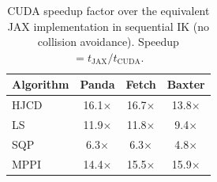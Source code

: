 \begin{table}[t]
\centering
\caption{CUDA speedup factor over the equivalent JAX implementation in sequential IK (no collision avoidance). Speedup $= t_{\text{JAX}} / t_{\text{CUDA}}$.}
\label{tab:ik_cuda_speedup}
\small
\begin{tabular}{lccc}
\toprule
\textbf{Algorithm} & \textbf{Panda} & \textbf{Fetch} & \textbf{Baxter} \\
\midrule
HJCD & 16.1$\times$ & 16.7$\times$ & 13.8$\times$ \\
LS & 11.9$\times$ & 11.8$\times$ & 9.4$\times$ \\
SQP & 6.3$\times$ & 6.3$\times$ & 4.8$\times$ \\
MPPI & 14.4$\times$ & 15.5$\times$ & 15.9$\times$ \\
\bottomrule
\end{tabular}
\end{table}